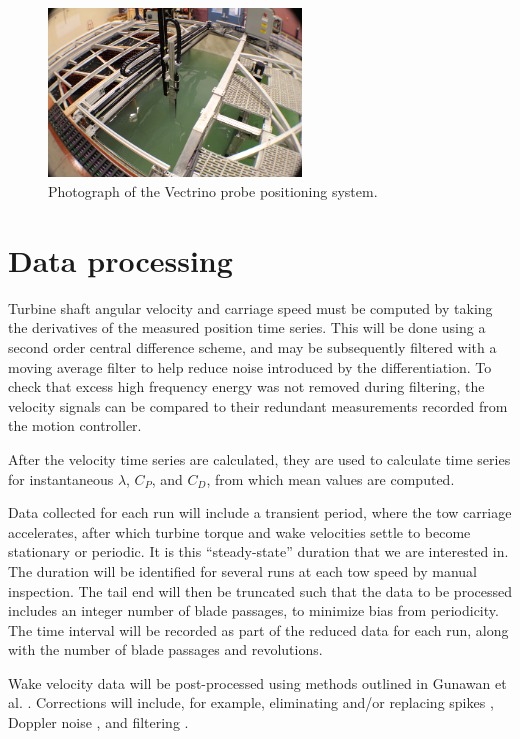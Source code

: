 \documentclass[12pt,letterpaper]{scrreprt}
\begin{document}
\begin{figure}[ht]
\centering
\includegraphics[width=0.6\textwidth]{Figures/yz_traverse}
\caption{Photograph of the Vectrino probe positioning system.}
\label{fig-yz_traverse}
\end{figure}

\section{Data processing}

Turbine shaft angular velocity and carriage speed must be computed by taking the
derivatives of the measured position time series. This will be done using a
second order central difference scheme, and may be subsequently filtered with a
moving average filter to help reduce noise introduced by the differentiation. To
check that excess high frequency energy was not removed during filtering, the
velocity signals can be compared to their redundant measurements recorded from
the motion controller.

After the velocity time series are calculated, they are used to calculate time
series for instantaneous $\lambda$, $C_P$, and $C_D$, from which mean values are
computed.

Data collected for each run will include a transient period, where the tow
carriage accelerates, after which turbine torque and wake velocities settle to
become stationary or periodic. It is this ``steady-state'' duration that we are
interested in. The duration will be identified for several runs at each tow
speed by manual inspection. The tail end will then be truncated such that the
data to be processed includes an integer number of blade passages, to minimize
bias from periodicity. The time interval will be recorded as part of the reduced
data for each run, along with the number of blade passages and revolutions.

Wake velocity data will be post-processed using methods outlined in Gunawan et
al. \cite{Gunawan2011}. Corrections will include, for example, eliminating
and/or replacing spikes \cite{Goring2002}, Doppler noise \cite{Voulgaris1998},
and filtering \cite{Garcia2005}.
\end{document}
